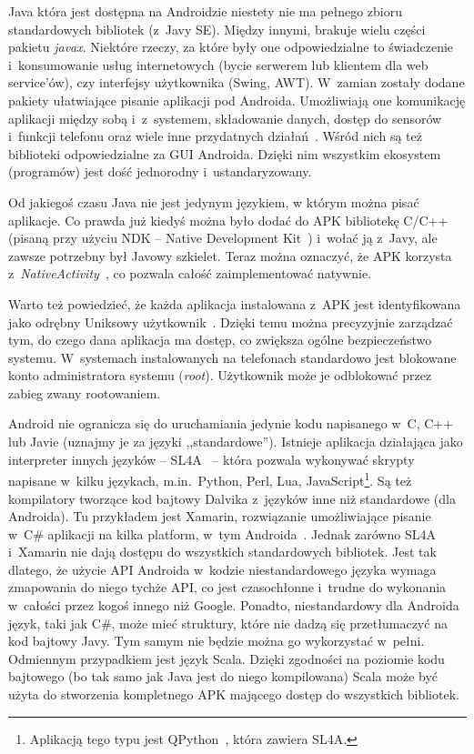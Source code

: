 Java która jest dostępna na Androidzie niestety nie ma pełnego zbioru standardowych bibliotek (z~Javy SE). Między innymi, brakuje wielu części pakietu \emph{javax}. Niektóre rzeczy, za które były one odpowiedzialne to świadczenie i~konsumowanie usług internetowych (bycie serwerem lub klientem dla web service'ów), czy interfejsy użytkownika (Swing, AWT). W~zamian zostały dodane pakiety ułatwiające pisanie aplikacji pod Androida. Umożliwiają one komunikację aplikacji między sobą i~z~systemem, składowanie danych, dostęp do sensorów i~funkcji telefonu oraz wiele inne przydatnych działań~\cite{android-package}. Wśród nich są też biblioteki odpowiedzialne za GUI Androida. Dzięki nim wszystkim ekosystem (programów) jest dość jednorodny i~ustandaryzowany.

Od jakiegoś czasu Java nie jest jedynym językiem, w którym można pisać aplikacje. Co prawda już kiedyś można było dodać do APK bibliotekę C/C++ (pisaną przy użyciu NDK -- Native Development Kit~\cite{android-ndk}) i~wołać ją z~Javy, ale zawsze potrzebny był Javowy szkielet. Teraz można oznaczyć, że APK korzysta z~\emph{NativeActivity}~\cite{android-native-activity}, co pozwala całość zaimplementować natywnie. 

Warto też powiedzieć, że każda aplikacja instalowana z~APK jest identyfikowana jako odrębny Uniksowy użytkownik~\cite{android-permissions}. Dzięki temu można precyzyjnie zarządzać tym, do czego dana aplikacja ma dostęp, co zwiększa ogólne bezpieczeństwo systemu. W~systemach instalowanych na telefonach standardowo jest blokowane konto administratora systemu (\emph{root}). Użytkownik może je odblokować przez zabieg zwany rootowaniem.

Android nie ogranicza się do uruchamiania jedynie kodu napisanego w~C, C++ lub Javie (uznajmy je za języki ,,standardowe''). Istnieje aplikacja działająca jako interpreter innych języków -- SL4A~\cite{android-sl4a} -- która pozwala wykonywać skrypty napisane w~kilku językach, m.in.\ Python, Perl, Lua, JavaScript\footnote{Aplikacją tego typu jest QPython~\cite{qpython}, która zawiera SL4A.}.
Są też kompilatory tworzące kod bajtowy Dalvika z~języków inne niż standardowe (dla Androida). Tu przykładem jest Xamarin, rozwiązanie umożliwiające pisanie w~C\# aplikacji na kilka platform, w~tym Androida~\cite{xamarin-overview}.
Jednak zarówno SL4A i~Xamarin nie dają dostępu do wszystkich standardowych bibliotek. Jest tak dlatego, że użycie API Androida w~kodzie niestandardowego języka wymaga zmapowania do niego tychże API, co jest czasochłonne i~trudne do wykonania w~całości przez kogoś innego niż Google. Ponadto, niestandardowy dla Androida język, taki jak C\#, może mieć struktury, które nie dadzą się przetłumaczyć na kod bajtowy Javy. Tym samym nie będzie można go wykorzystać w~pełni. Odmiennym przypadkiem jest język Scala. Dzięki zgodności na poziomie kodu bajtowego (bo tak samo jak Java jest do niego kompilowana) Scala może być użyta do stworzenia kompletnego APK mającego dostęp do wszystkich bibliotek.

